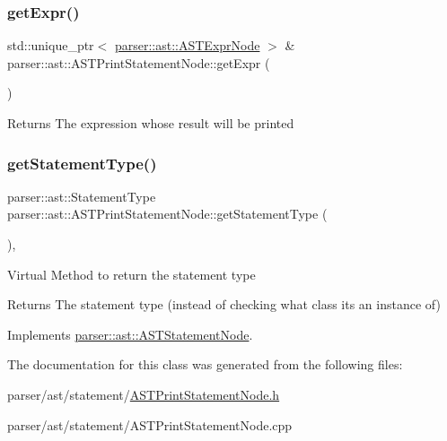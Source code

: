 \subsubsection{\texorpdfstring{get\+Expr()}{getExpr()}}
{\footnotesize\ttfamily std\+::unique\+\_\+ptr$<$ \hyperlink{classparser_1_1ast_1_1ASTExprNode}{parser\+::ast\+::\+A\+S\+T\+Expr\+Node} $>$ \& parser\+::ast\+::\+A\+S\+T\+Print\+Statement\+Node\+::get\+Expr (\begin{DoxyParamCaption}{ }\end{DoxyParamCaption})}

\begin{DoxyReturn}{Returns}
The expression whose result will be printed 
\end{DoxyReturn}
\mbox{\label{classparser_1_1ast_1_1ASTPrintStatementNode_a9526c5de33100e05f1ccba710c0a9a34}} 
\subsubsection{\texorpdfstring{get\+Statement\+Type()}{getStatementType()}}
{\footnotesize\ttfamily parser\+::ast\+::\+Statement\+Type parser\+::ast\+::\+A\+S\+T\+Print\+Statement\+Node\+::get\+Statement\+Type (\begin{DoxyParamCaption}{ }\end{DoxyParamCaption})\hspace{0.3cm}{\ttfamily [override]}, {\ttfamily [virtual]}}

Virtual Method to return the statement type \begin{DoxyReturn}{Returns}
The statement type (instead of checking what class it\textquotesingle{}s an instance of) 
\end{DoxyReturn}


Implements \hyperlink{classparser_1_1ast_1_1ASTStatementNode_ac381d35d12f774a1bab0e209c5bfec1f}{parser\+::ast\+::\+A\+S\+T\+Statement\+Node}.



The documentation for this class was generated from the following files\+:\begin{DoxyCompactItemize}
\item 
parser/ast/statement/\hyperlink{ASTPrintStatementNode_8h}{A\+S\+T\+Print\+Statement\+Node.\+h}\item 
parser/ast/statement/A\+S\+T\+Print\+Statement\+Node.\+cpp\end{DoxyCompactItemize}
